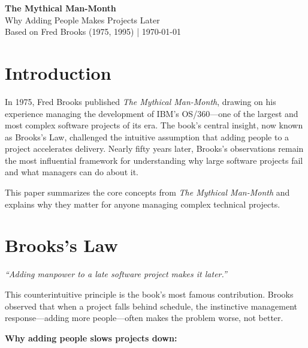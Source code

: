 \documentclass[11pt, letterpaper]{article}
\begin{document}
\begin{center}
{\Large \textbf{The Mythical Man-Month}}\\[0.5em]
{\color{accent}\large Why Adding People Makes Projects Later}\\[0.3em]
{\small Based on Fred Brooks (1975, 1995) | \today}
\end{center}

\vspace{1.5em}

\section*{Introduction}

In 1975, Fred Brooks published \textit{The Mythical Man-Month}, drawing on his experience managing the development of IBM's OS/360---one of the largest and most complex software projects of its era. The book's central insight, now known as Brooks's Law, challenged the intuitive assumption that adding people to a project accelerates delivery. Nearly fifty years later, Brooks's observations remain the most influential framework for understanding why large software projects fail and what managers can do about it.

This paper summarizes the core concepts from \textit{The Mythical Man-Month} and explains why they matter for anyone managing complex technical projects.

\vspace{1em}

\section*{Brooks's Law}

\begin{center}
\textit{``Adding manpower to a late software project makes it later.''}
\end{center}

\vspace{0.5em}

This counterintuitive principle is the book's most famous contribution. Brooks observed that when a project falls behind schedule, the instinctive management response---adding more people---often makes the problem worse, not better.

\textbf{Why adding people slows projects down:}
\end{document}
